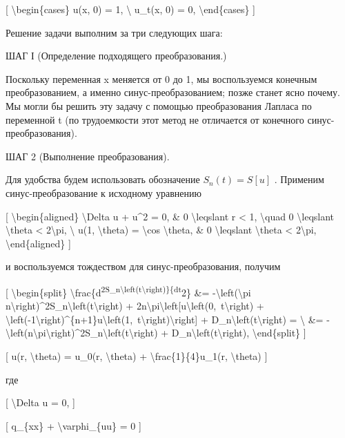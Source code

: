 \documentclass[
]{article}
\begin{document}
{[} \textbackslash begin\{cases\} u(x, 0) = 1, \textbackslash{} u\_t(x,
0) = 0, \textbackslash end\{cases\} {]}

Решение задачи выполним за три следующих шага:

ШАГ І (Определение подходящего преобразования.)

Поскольку переменная x меняется от 0 до 1, мы воспользуемся конечным
преобразованием, а именно синус-преобразованием; позже станет ясно
почему. Мы могли бы решить эту задачу с помощью преобразования Лапласа
по переменной t (по трудоемкости этот метод не отличается от конечного
синус-преобразования).

ШАГ 2 (Выполнение преобразования).

Для удобства будем использовать обозначение \(S_n(t) = S[u]\) . Применим
синус-преобразование к исходному уравнению

{[} \textbackslash begin\{aligned\} \textbackslash Delta u + u\^{}2 = 0,
\& 0 \textbackslash leqslant r \textless{} 1, \textbackslash quad 0
\textbackslash leqslant \textbackslash theta \textless{}
2\textbackslash pi, \textbackslash{} u(1, \textbackslash theta) =
\textbackslash cos \textbackslash theta, \& 0 \textbackslash leqslant
\textbackslash theta \textless{} 2\textbackslash pi,
\textbackslash end\{aligned\} {]}

и воспользуемся тождеством для синус-преобразования, получим

{[} \textbackslash begin\{split\}
\textbackslash frac\{d\textsuperscript{2S\_n\textbackslash left(t\textbackslash right)\}\{dt}2\}
\&= -\textbackslash left(\textbackslash pi
n\textbackslash right)\^{}2S\_n\textbackslash left(t\textbackslash right)
+
2n\textbackslash pi\textbackslash left{[}u\textbackslash left(0,~t\textbackslash right)
+
\textbackslash left(-1\textbackslash right)\^{}\{n+1\}u\textbackslash left(1,~t\textbackslash right)\textbackslash right{]}
+ D\_n\textbackslash left(t\textbackslash right) = \textbackslash{} \&=
-\textbackslash left(n\textbackslash pi\textbackslash right)\^{}2S\_n\textbackslash left(t\textbackslash right)
+ D\_n\textbackslash left(t\textbackslash right),
\textbackslash end\{split\} {]}

{[} u(r, \textbackslash theta) = u\_0(r, \textbackslash theta) +
\textbackslash frac\{1\}\{4\}u\_1(r, \textbackslash theta) {]}

где

{[} \textbackslash Delta u = 0, {]}

{[} q\_\{xx\} + \textbackslash varphi\_\{uu\} = 0 {]}
\end{document}
